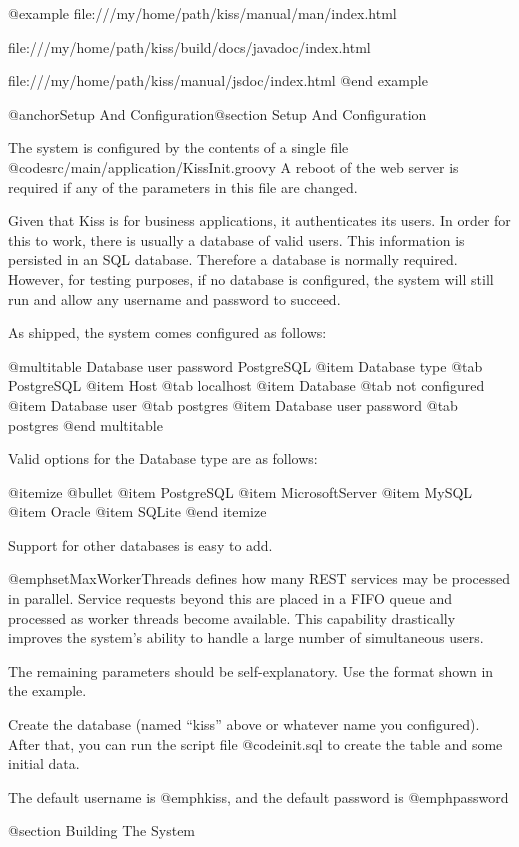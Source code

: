 @example
file:///my/home/path/kiss/manual/man/index.html

file:///my/home/path/kiss/build/docs/javadoc/index.html

file:///my/home/path/kiss/manual/jsdoc/index.html
@end example

@anchor{Setup And Configuration}@section Setup And Configuration

The system is configured by the contents of a single file @code{src/main/application/KissInit.groovy}
A reboot of the web server is required if any of the parameters in this file are changed.

Given that Kiss is for business applications, it authenticates its
users.  In order for this to work, there is usually a database of valid
users.  This information is persisted in an SQL database.  Therefore a
database is normally required.  However, for testing purposes, if no
database is configured, the system will still run and allow any
username and password to succeed.

As shipped, the system comes configured as follows:

@multitable {Database user password} {PostgreSQL} 
@item Database type
@tab PostgreSQL
@item Host
@tab localhost
@item Database
@tab not configured
@item Database user
@tab postgres
@item Database user password
@tab postgres
@end multitable

Valid options for the Database type are as follows:

@itemize @bullet
@item
PostgreSQL
@item
MicrosoftServer
@item
MySQL
@item
Oracle
@item
SQLite
@end itemize

Support for other databases is easy to add.

@emph{setMaxWorkerThreads} defines how many REST services may be processed in parallel.  Service requests
beyond this are placed in a FIFO queue and processed as worker threads become available.  This capability
drastically improves the system's ability to handle a large number of simultaneous users.

The remaining parameters should be self-explanatory.  Use the format
shown in the example.

Create the database (named ``kiss'' above or whatever name you
configured).  After that, you can run the script file @code{init.sql}
to create the table and some initial data.

The default username is @emph{kiss}, and the default password is
@emph{password}

@section Building The System

